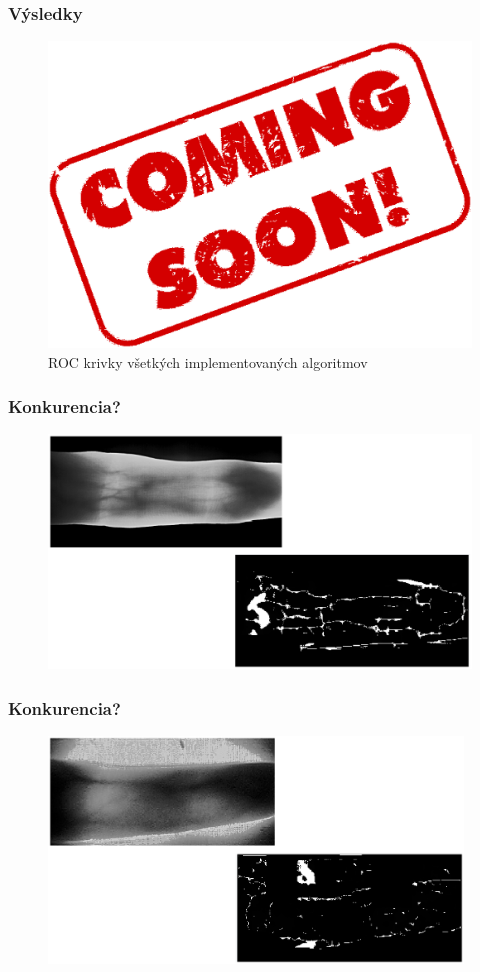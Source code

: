 \documentclass[compress]{beamer}
\begin{document}
\begin{frame}
\frametitle{Výsledky}
\begin{figure}[ht!]
	\centering
	\includegraphics[width=12cm]{../fig/all.eps}
	\caption{\label{fig:all} ROC krivky všetkých implementovaných algoritmov}
\end{figure}
\end{frame}

\begin{frame}
\frametitle{Konkurencia?}
\begin{figure}[ht!]
	\centering
	\includegraphics[width=13cm]{../fig/test_orig_pres.eps}
\end{figure}
\end{frame}

\begin{frame}
\frametitle{Konkurencia?}
\begin{figure}[ht!]
	\centering
	\includegraphics[width=11cm]{../fig/test_nas_pres.eps}
\end{figure}
\end{frame}
\end{document}
